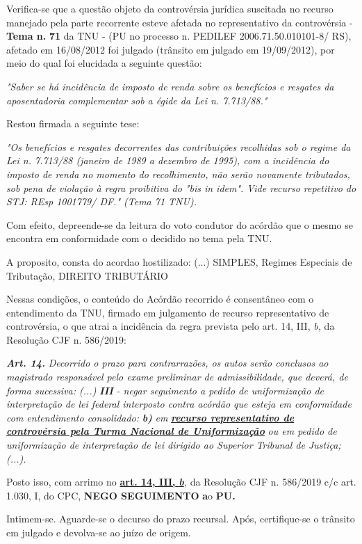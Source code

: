 \documentclass[12pt]{article}
\begin{document}
\justifying
\noindent Verifica-se que a questão objeto da controvérsia jurídica suscitada no recurso manejado pela parte recorrente esteve afetada no representativo da controvérsia - \textbf{Tema n. }\textbf{71} da TNU - (PU no processo n. PEDILEF 2006.71.50.010101-8/ RS),  afetado em 16/08/2012 foi julgado (trânsito em julgado em 19/09/2012), por meio do qual foi elucidada a seguinte questão:

\noindent \textit{"Saber se há incidência de imposto de renda sobre os benefícios e resgates da aposentadoria complementar sob a égide da Lei n. 7.713/88."}

\noindent Restou firmada a seguinte tese:

\noindent \textit{"Os benefícios e resgates decorrentes das contribuições recolhidas sob o regime da Lei n. 7.713/88 (janeiro de 1989 a dezembro de 1995), com a incidência do imposto de renda no momento do recolhimento, não serão novamente tributados, sob pena de violação à regra proibitiva do "bis in idem". Vide recurso repetitivo do STJ: REsp 1001779/ DF." (Tema 71 TNU).}

\noindent Com efeito, depreende-se da leitura do voto condutor do acórdão que o mesmo se encontra em conformidade com o decidido no  tema pela TNU.

\noindent A proposito, consta do acordao hostilizado: (...) SIMPLES, Regimes Especiais de Tributação, DIREITO TRIBUTÁRIO

\noindent Nessas condições, o conteúdo do Acórdão recorrido é consentâneo com o entendimento da TNU, firmado em julgamento de recurso representativo de controvérsia, o que atrai a incidência da regra prevista pelo art. 14, III, \textit{b,} da Resolução CJF n. 586/2019:

\noindent \textit{\textbf{Art. 14.}}\textit{ Decorrido o prazo para contrarrazões, os autos serão conclusos ao magistrado responsável pelo exame preliminar de admissibilidade, que deverá, de forma sucessiva: (...) }\textit{\textbf{III }}\textit{- negar seguimento a pedido de uniformização de interpretação de lei federal interposto contra acórdão que esteja em conformidade com entendimento consolidado: }\textit{\textbf{b)}}\textit{ em }\uline{\textit{\textbf{recurso representativo de controvérsia pela Turma Nacional de Uniformização}}}\textit{ ou em pedido de uniformização de interpretação de lei dirigido ao Superior Tribunal de Justiça;(...).}

\noindent Posto isso, com arrimo no \uline{\textbf{art. 14, III, }}\uline{\textit{\textbf{b}}}\textit{,} da Resolução CJF n. 586/2019 c/c art. 1.030, I, do CPC, \textbf{NEGO SEGUIMENTO }\textbf{a}o\textbf{ PU}\textbf{.}

\noindent Intimem-se. Aguarde-se o decurso do prazo recursal. Após, certifique-se o trânsito em julgado e devolva-se ao juízo de origem.
\end{document}
